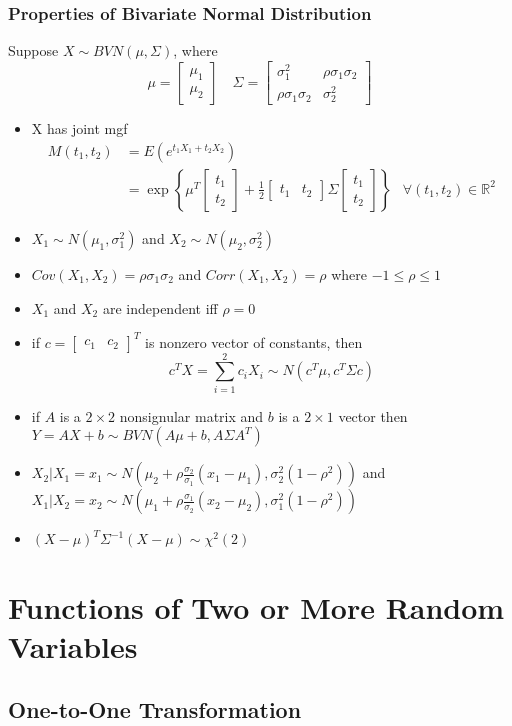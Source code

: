 \documentclass[11pt]{article}
\newcommand{\R}{{\mathbb{R}}}
\newcommand{\cv}[1]{\begin{bmatrix} #1 \end{bmatrix}}
\begin{document}
\subsubsection{Properties of Bivariate Normal Distribution}
Suppose $X\sim BVN(\mu,\Sigma)$, where \[\mu=\cv{\mu_1\\\mu_2}\quad \Sigma=\cv{\sigma_1^2 &\rho\sigma_1\sigma_2\\ \rho\sigma_1\sigma_2 &\sigma_2^2}\]
\begin{itemize}
    \item X has joint mgf 
    \begin{align*}
        M(t_1,t_2) &= E(e^{t_1X_1+t_2X_2}) \\
                   &= \exp\left\{ \mu^T\cv{t_1\\t_2} + \frac{1}{2} \cv{t_1&t_2} \Sigma \cv{t_1\\t_2} \right\} &\forall(t_1,t_2)\in\R^2
    \end{align*}
    \item $X_1\sim N(\mu_1,\sigma_1^2)$ and $X_2\sim N(\mu_2,\sigma_2^2)$
    \item $Cov(X_1,X_2)=\rho\sigma_1\sigma_2$ and $Corr(X_1,X_2)=\rho$ where $-1\leq\rho\leq1$
    \item $X_1$ and $X_2$ are independent iff $\rho=0$
    \item if $c=\cv{c_1&c_2}^T$ is nonzero vector of constants, then 
    \[c^TX = \sum_{i=1}^{2}c_iX_i \sim N(c^T\mu,c^T\Sigma c)\]
    \item if $A$ is a $2\times 2$ nonsignular matrix and $b$ is a $2\times 1$ vector then $Y=AX+b\sim BVN(A\mu+b,A\Sigma A^T)$
    \item $X_2|X_1 = x_1 \sim N(\mu_2+\rho\frac{\sigma_2}{\sigma_1}(x_1-\mu_1),\sigma_2^2(1-\rho^2))$ and $X_1|X_2=x_2\sim N(\mu_1+\rho\frac{\sigma_1}{\sigma_2}(x_2-\mu_2),\sigma_1^2(1-\rho^2))$
    \item $(X-\mu)^T\Sigma^{-1}(X-\mu)\sim\chi^2(2)$
\end{itemize}

\section{Functions of Two or More Random Variables}
\subsection{One-to-One Transformation}
\end{document}
